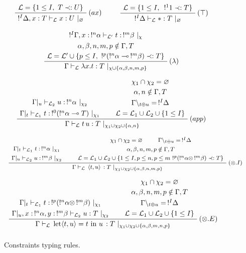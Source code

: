 \begin{figure}[!ht]
\begin{mdframed}
	$$ $$
	$$ \mbox{
		\AxiomC{$\mathcal{L} = \{1 \le I, ~ T \prec: U\}$}
		\RightLabel{$(ax)$}
		\UnaryInfC{$!^I \Delta, x : T \vdash_\mathcal{L} x : U ~|_\varnothing$}
		\DisplayProof
		~~
		~~
		\AxiomC{$\mathcal{L} = \{1 \le I, ~ \,!^1 1 \prec: T \}$}
		\RightLabel{$(\top)$}
		\UnaryInfC{$!^I \Delta \vdash_\mathcal{L} * : T ~|_\varnothing$}
		\DisplayProof
	} $$
	$$ $$
	$$ \mbox{
		\AxiomC{$!^I\Gamma, x : \,!^n\alpha \vdash_\mathcal{L'} t : \,!^m\beta ~|_\chi$} \noLine
		\UnaryInfC{$\alpha, \beta, n, m, p \notin \Gamma, T$} \noLine
		\UnaryInfC{$\mathcal{L} = \mathcal{L'} \cup \{ p \le I, ~ !^p(!^n\alpha \multimap \,!^m\beta) \prec: T \}$}
		\RightLabel{$(\lambda)$}
		\UnaryInfC{$\Gamma \vdash_\mathcal{L} \lambda x.t : T ~|_{\chi \cup \{\alpha, \beta, n, m, p \}}$}
		\DisplayProof
	} $$
	$$ $$
	$$ \mbox{
		\AxiomC{$\Gamma|_u \vdash_{\mathcal{L}_2} u : \,!^n\alpha ~|_{\chi_2}$} \noLine
		\UnaryInfC{$\Gamma|_t \vdash_{\mathcal{L}_1} t : \,!^0(!^n\alpha \multimap T) ~|_{\chi_1}$} \noLine
		\AxiomC{$\chi_1 \cap \chi_2 = \varnothing$} \noLine
    \UnaryInfC{$\alpha, n \notin \Gamma, T$} \noLine
    \UnaryInfC{$\Gamma \backslash_{t \oplus u} = \,!^I \Delta$} \noLine
    \UnaryInfC{$\mathcal{L} = \mathcal{L}_1 \cup \mathcal{L}_2 \cup \{ 1 \le I \}$}
		\RightLabel{$(app)$}
		\BinaryInfC{$\Gamma \vdash_\mathcal{L} t \, u : T ~|_{\chi_1 \cup \chi_2 \cup \{ \alpha, n\}}$}
		\DisplayProof
	} $$
	$$ $$	
	$$ \mbox{
		\footnotesize
		\AxiomC{$\Gamma|_t \vdash_{\mathcal{L}_1} t : \, !^n\alpha ~|_{\chi_1}$} \noLine
		\UnaryInfC{$\Gamma|_u \vdash_{\mathcal{L}_2} u : \, !^m\beta ~|_{\chi_2}$}
		\AxiomC{$\chi_1 \cap \chi_2 = \varnothing$} \noLine
		\AxiomC{$\Gamma \backslash_{t \oplus u} = \,!^I \Delta$} \noLine
		\BinaryInfC{$\alpha, \beta, n, m, p \notin \Gamma, T$} \noLine
		\UnaryInfC{$\mathcal{L} = \mathcal{L}_1 \cup \mathcal{L}_2 \cup \{ 1 \le I, p \le n, p \le m ~!^p(!^n\alpha \otimes \,!^m\beta) \prec: T \}$}
		\RightLabel{$(\otimes.I)$}
		\BinaryInfC{$\Gamma \vdash_\mathcal{L} \, \pair{t}{u} \, : T ~|_{\chi_1 \cup \chi_2 \cup \{\alpha, \beta, n, m, p \}}$}
		\DisplayProof
	} $$
	$$ $$
	$$ \mbox{
		\AxiomC{$\Gamma|_t \vdash_{\mathcal{L}_1} t : \, !^p (!^n\alpha \otimes \,!^m\beta) ~|_{\chi_1}$} \noLine
		\UnaryInfC{$\Gamma|_u, x : \,!^n\alpha, y : \,!^m\beta \vdash_{\mathcal{L}_2} u : T ~|_{\chi_2}$}
		\AxiomC{$\chi_1 \cap \chi_2 = \varnothing$} \noLine
		\UnaryInfC{$\alpha, \beta, n, m, p \notin \Gamma, T$} \noLine
		\UnaryInfC{$\Gamma \backslash_{t \oplus u} = \,!^I \Delta$} \noLine
		\UnaryInfC{$\mathcal{L} = \mathcal{L}_1 \cup \mathcal{L}_2 \cup \{ 1 \le I \}$}
		\RightLabel{$(\otimes.E)$}
		\BinaryInfC{$\Gamma \vdash_\mathcal{L} \, \text{let} \pair{t}{u} = t ~ \text{in} ~ u \, : T ~|_{\chi_1 \cup \chi_2 \cup \{\alpha,\beta,m,n,p \}}$}
		\DisplayProof
	} $$
	$$ $$
\end{mdframed}
\caption{Constraints typing rules.}
\label{ctypeQP'}
\end{figure}


